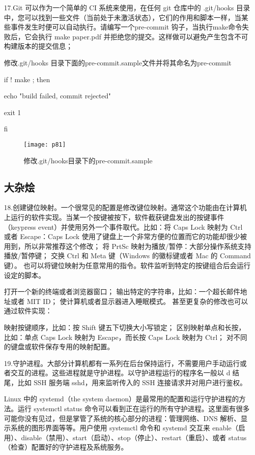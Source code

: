 \documentclass[a4paper ,12pt]{article}
\begin{document}
	17.Git 可以作为一个简单的 CI 系统来使用，在任何 git 仓库中的 .git/hooks 目录中，您可以找到一些文件（当前处于未激活状态），它们的作用和脚本一样，当某些事件发生时便可以自动执行。请编写一个pre-commit 钩子，当执行make命令失败后，它会执行 make paper.pdf 并拒绝您的提交。这样做可以避免产生包含不可构建版本的提交信息；
	
	修改.git/hooks 目录下面的pre-commit.sample文件并将其命名为pre-commit
	
	if  ! make ; then
	
	echo "build failed, commit rejected"
	
	exit 1
	
	fi
	\begin{figure}[h]
		\centering
		\texttt{[image: p81]}
		\caption{修改.git/hooks目录下的pre-commit.sample}
	\end{figure}
	
	\subsection{大杂烩}
	18.创建键位映射。一个很常见的配置是修改键位映射。通常这个功能由在计算机上运行的软件实现。当某一个按键被按下，软件截获键盘发出的按键事件（keypress event）并使用另外一个事件取代。比如：将 Caps Lock 映射为 Ctrl 或者 Escape：Caps Lock 使用了键盘上一个非常方便的位置而它的功能却很少被用到，所以非常推荐这个修改；
	将 PrtSc 映射为播放/暂停：大部分操作系统支持播放/暂停键；
	交换 Ctrl 和 Meta 键（Windows 的徽标键或者 Mac 的 Command 键）。
	也可以将键位映射为任意常用的指令。软件监听到特定的按键组合后会运行设定的脚本。
	
	打开一个新的终端或者浏览器窗口；
	输出特定的字符串，比如：一个超长邮件地址或者 MIT ID；
	使计算机或者显示器进入睡眠模式。
	甚至更复杂的修改也可以通过软件实现：
	
	映射按键顺序，比如：按 Shift 键五下切换大小写锁定；
	区别映射单点和长按，比如：单点 Caps Lock 映射为 Escape，而长按 Caps Lock 映射为 Ctrl；
	对不同的键盘或软件保存专用的映射配置。
	
	19.守护进程。大部分计算机都有一系列在后台保持运行，不需要用户手动运行或者交互的进程。这些进程就是守护进程。以守护进程运行的程序名一般以 d 结尾，比如 SSH 服务端 sshd，用来监听传入的 SSH 连接请求并对用户进行鉴权。
	
	Linux 中的 systemd（the system daemon）是最常用的配置和运行守护进程的方法。运行 systemctl status 命令可以看到正在运行的所有守护进程。这里面有很多可能你没有见过，但是掌管了系统的核心部分的进程：管理网络、DNS 解析、显示系统的图形界面等等。用户使用 systemctl 命令和 systemd 交互来 enable（启用）、disable（禁用）、start（启动）、stop（停止）、restart（重启）、或者 status（检查）配置好的守护进程及系统服务。
	
\end{document}
